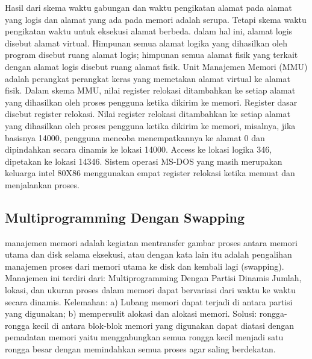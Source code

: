 Hasil dari skema waktu gabungan dan waktu pengikatan alamat pada alamat yang logis dan alamat yang ada pada memori adalah serupa. Tetapi skema waktu pengikatan waktu untuk eksekusi alamat berbeda. dalam hal ini, alamat logis disebut alamat virtual. Himpunan semua alamat logika yang dihasilkan oleh program disebut ruang alamat logis; himpunan semua alamat fisik yang terkait dengan alamat logis disebut ruang alamat fisik.
Unit Manajemen Memori (MMU) adalah perangkat perangkat keras yang memetakan alamat virtual ke alamat fisik. Dalam skema MMU, nilai register relokasi ditambahkan ke setiap alamat yang dihasilkan oleh proses pengguna ketika dikirim ke memori.
Register dasar disebut register relokasi. Nilai register relokasi ditambahkan ke setiap alamat yang dihasilkan oleh proses pengguna ketika dikirim ke memori, misalnya, jika basisnya 14000, pengguna mencoba menempatkannya ke alamat 0 dan dipindahkan secara dinamis ke lokasi 14000. Access ke lokasi logika 346, dipetakan ke lokasi 14346. Sistem operasi MS-DOS yang masih merupakan keluarga intel 80X86 menggunakan empat register relokasi ketika memuat dan menjalankan proses.

\subsection {Multiprogramming Dengan Swapping}
manajemen memori adalah kegiatan mentransfer gambar proses antara memori utama dan disk selama eksekusi, atau dengan kata lain itu adalah pengalihan manajemen proses dari memori utama ke disk dan kembali lagi (swapping). Manajemen ini terdiri dari:
Multiprogramming Dengan Partisi Dinamis
Jumlah, lokasi, dan ukuran proses dalam memori dapat bervariasi dari waktu ke waktu secara dinamis. Kelemahan: a) Lubang memori dapat terjadi di antara partisi yang digunakan; b) mempersulit alokasi dan alokasi memori.
{Solusi}:
rongga-rongga kecil di antara blok-blok memori yang digunakan dapat diatasi dengan pemadatan memori yaitu menggabungkan semua rongga kecil menjadi satu rongga besar dengan memindahkan semua proses agar saling berdekatan.
 
